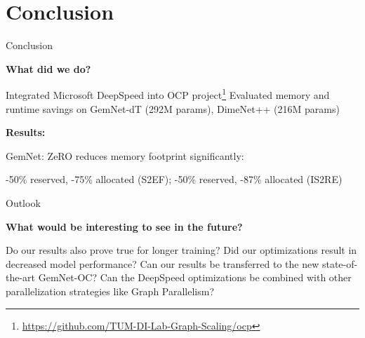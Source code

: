 \section{Conclusion}

\begin{frame}{Conclusion}
    \begin{small}
        \textbf{What did we do?} \vspace*{-0.3cm} 
        \begin{itemize}
            \bitem Integrated Microsoft DeepSpeed into OCP project\footnote{\url{https://github.com/TUM-DI-Lab-Graph-Scaling/ocp}} \vspace*{-0.3cm} 
            \bitem Evaluated memory and runtime savings on GemNet-dT (292M params), DimeNet++ (216M params) \vspace*{-0.3cm} 
        \end{itemize}
        \textbf{Results:} \vspace*{-0.3cm}
        \begin{itemize}
            \bitem GemNet: ZeRO reduces memory footprint significantly: \vspace*{-0.3cm} \\
            \begin{center}
                -50\% reserved, -75\% allocated (S2EF); -50\% reserved, -87\% allocated (IS2RE) \vspace*{-0.3cm} 
            \end{center}
        \end{itemize}
    \end{small}
\end{frame}

\begin{frame}{Outlook}
    \begin{small}
        \textbf{What would be interesting to see in the future?} 
        \begin{itemize}
            \bitem Do our results also prove true for longer training? 
            \bitem Did our optimizations result in decreased model performance? 
            \bitem Can our results be transferred to the new state-of-the-art GemNet-OC? 
            \bitem Can the DeepSpeed optimizations be combined with other parallelization strategies 
            like Graph Parallelism?
        \end{itemize}
    \end{small}
\end{frame}

